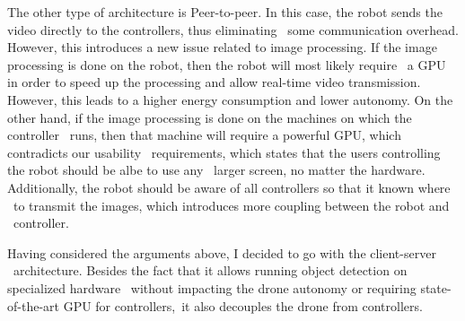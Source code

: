 The other type of architecture is Peer-to-peer.
In this case, the robot sends the video directly to the controllers, thus eliminating \
some communication overhead.
However, this introduces a new issue related to image processing.
If the image processing is done on the robot, then the robot will most likely require \
a GPU in order to speed up the processing and allow real-time video transmission.
However, this leads to a higher energy consumption and lower autonomy.
On the other hand, if the image processing is done on the machines on which the controller \
runs, then that machine will require a powerful GPU, which contradicts our usability \
requirements, which states that the users controlling the robot should be albe to use any \
larger screen, no matter the hardware.
Additionally, the robot should be aware of all controllers so that it known where \
to transmit the images, which introduces more coupling between the robot and \
controller.

Having considered the arguments above, I decided to go with the client-server \
architecture.
Besides the fact that it allows running object detection on specialized hardware \
without impacting the drone autonomy or requiring state-of-the-art GPU for controllers,\
it also decouples the drone from controllers.

